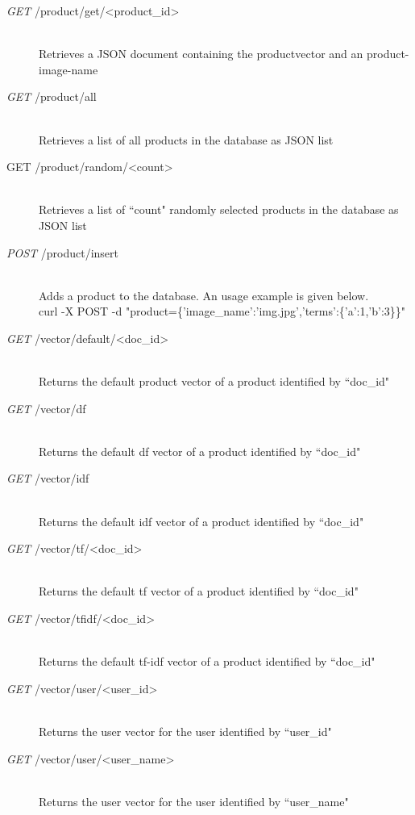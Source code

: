\begin{description}
    \item[\textit{GET} /product/get/\textless product\_id\textgreater]\hfill\\
        Retrieves a JSON document containing the productvector and an product-image-name
    \item[\textit{GET} /product/all]\hfill\\
        Retrieves a list of all products in the database as JSON list
    \item[GET /product/random/\textless count\textgreater]\hfill\\
        Retrieves a list of ``count" randomly selected products in the database as JSON list
    \item[\textit{POST} /product/insert]\hfill\\
        Adds a product to the database.
        An usage example is given below.
        \\
        curl -X POST -d "product=\{'image\_name':'img.jpg','terms':\{'a':1,'b':3\}\}"
    \item[\textit{GET} /vector/default/\textless doc\_id\textgreater]\hfill\\
        Returns the default product vector of a product identified by ``doc\_id"
    \item[\textit{GET} /vector/df]\hfill\\
        Returns the default df vector of a product identified by ``doc\_id"
    \item[\textit{GET} /vector/idf]\hfill\\
        Returns the default idf vector of a product identified by ``doc\_id"
    \item[\textit{GET} /vector/tf/\textless doc\_id\textgreater]\hfill\\
        Returns the default tf vector of a product identified by ``doc\_id"
    \item[\textit{GET} /vector/tfidf/\textless doc\_id\textgreater]\hfill\\
        Returns the default tf-idf vector of a product identified by ``doc\_id"
    \item[\textit{GET} /vector/user/\textless user\_id\textgreater]\hfill\\
        Returns the user vector for the user identified by ``user\_id"
    \item[\textit{GET} /vector/user/\textless user\_name\textgreater]\hfill\\
        Returns the user vector for the user identified by ``user\_name"

\end{description}
